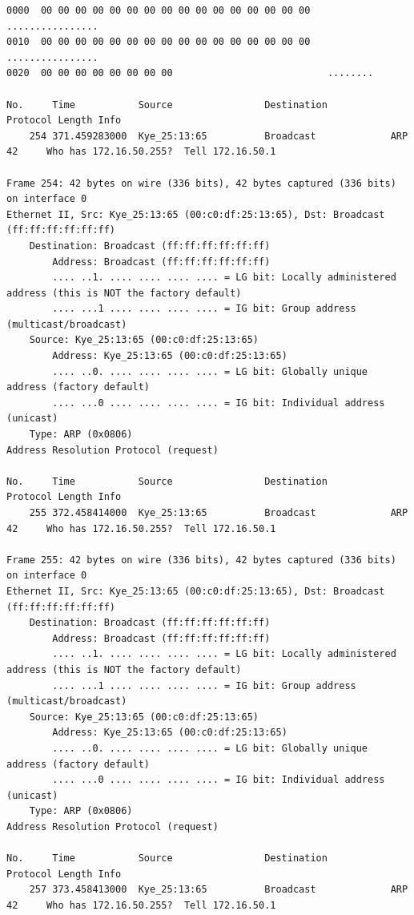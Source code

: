\documentclass[a4paper,11pt]{article}
\begin{document}
\begin{lstlisting}
0000  00 00 00 00 00 00 00 00 00 00 00 00 00 00 00 00   ................
0010  00 00 00 00 00 00 00 00 00 00 00 00 00 00 00 00   ................
0020  00 00 00 00 00 00 00 00                           ........

No.     Time           Source                Destination           Protocol Length Info
    254 371.459283000  Kye_25:13:65          Broadcast             ARP      42     Who has 172.16.50.255?  Tell 172.16.50.1

Frame 254: 42 bytes on wire (336 bits), 42 bytes captured (336 bits) on interface 0
Ethernet II, Src: Kye_25:13:65 (00:c0:df:25:13:65), Dst: Broadcast (ff:ff:ff:ff:ff:ff)
    Destination: Broadcast (ff:ff:ff:ff:ff:ff)
        Address: Broadcast (ff:ff:ff:ff:ff:ff)
        .... ..1. .... .... .... .... = LG bit: Locally administered address (this is NOT the factory default)
        .... ...1 .... .... .... .... = IG bit: Group address (multicast/broadcast)
    Source: Kye_25:13:65 (00:c0:df:25:13:65)
        Address: Kye_25:13:65 (00:c0:df:25:13:65)
        .... ..0. .... .... .... .... = LG bit: Globally unique address (factory default)
        .... ...0 .... .... .... .... = IG bit: Individual address (unicast)
    Type: ARP (0x0806)
Address Resolution Protocol (request)

No.     Time           Source                Destination           Protocol Length Info
    255 372.458414000  Kye_25:13:65          Broadcast             ARP      42     Who has 172.16.50.255?  Tell 172.16.50.1

Frame 255: 42 bytes on wire (336 bits), 42 bytes captured (336 bits) on interface 0
Ethernet II, Src: Kye_25:13:65 (00:c0:df:25:13:65), Dst: Broadcast (ff:ff:ff:ff:ff:ff)
    Destination: Broadcast (ff:ff:ff:ff:ff:ff)
        Address: Broadcast (ff:ff:ff:ff:ff:ff)
        .... ..1. .... .... .... .... = LG bit: Locally administered address (this is NOT the factory default)
        .... ...1 .... .... .... .... = IG bit: Group address (multicast/broadcast)
    Source: Kye_25:13:65 (00:c0:df:25:13:65)
        Address: Kye_25:13:65 (00:c0:df:25:13:65)
        .... ..0. .... .... .... .... = LG bit: Globally unique address (factory default)
        .... ...0 .... .... .... .... = IG bit: Individual address (unicast)
    Type: ARP (0x0806)
Address Resolution Protocol (request)

No.     Time           Source                Destination           Protocol Length Info
    257 373.458413000  Kye_25:13:65          Broadcast             ARP      42     Who has 172.16.50.255?  Tell 172.16.50.1


\end{lstlisting}
\end{document}

